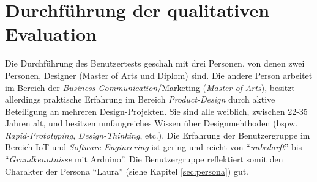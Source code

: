 \section{Durchführung der qualitativen Evaluation}

Die Durchführung des Benutzertests geschah mit drei Personen, von denen zwei Personen, Designer (Master of Arts und Diplom) sind. Die andere Person arbeitet im Bereich der \textit{Business-Communication}/Marketing (\textit{Master of Arts}), besitzt allerdings praktische Erfahrung im Bereich \textit{Product-Design} durch aktive Beteiligung an mehreren Design-Projekten. Sie sind alle weiblich, zwischen 22-35 Jahren alt, und besitzen umfangreiches Wissen über Designmehthoden (bspw. \textit{Rapid-Prototyping}, \textit{Design-Thinking}, etc.). Die Erfahrung der Benutzergruppe im Bereich \ac{IoT} und \textit{Soft\-ware-Engineering} ist gering und reicht von "`\textit{unbedarft}"' bis "`\textit{Grundkenntnisse} mit Arduino"'. Die Benutzergruppe reflektiert somit den Charakter der Persona "`Laura"' (siehe Kapitel \ref{sec:persona}) gut.

